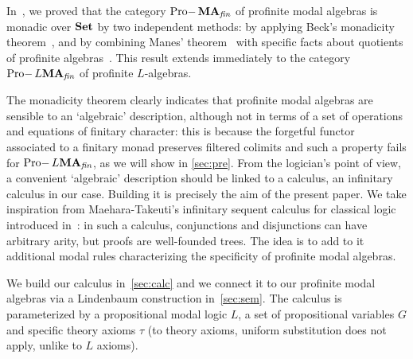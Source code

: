 \documentclass{article}
\theoremstyle{definition}
\DeclareMathOperator{\Pro}{Pro-}
\newcommand{\MA}{\textup{\textbf{MA}}}
\newcommand{\fin}{\textit{fin}}
\newcommand{\Set}{\textup{\textbf{Set}}}
\begin{document}
In~\cite{MDB-SG}, we proved that the category $\Pro \MA_\fin$ of profinite modal algebras is monadic over $\Set$ by two independent methods: by applying Beck’s monadicity theorem~\cite{CWM}, and by combining Manes’ theorem~\cite{manes} with specific facts about quotients of profinite algebras~\cite{gehrke}. This result extends immediately to the category $\Pro L\MA_\fin$ of profinite $L$-algebras.%

The monadicity theorem clearly indicates that profinite modal algebras are sensible to an `algebraic' description, although not in terms of a set of operations and equations of finitary character: this is because the forgetful functor associated to a finitary monad preserves filtered colimits and such a property fails for $\Pro L\MA_\fin$,
as we will show in \cref{sec:pre}. From the logician's point of view, a convenient `algebraic' description should be linked to a calculus, an infinitary calculus in our case.
Building it is precisely  the aim of the present paper. We take inspiration from Maehara-Takeuti's infinitary sequent calculus for classical logic introduced in~\cite[Chapter 4]{Tak}: in such a calculus,  conjunctions and disjunctions can have arbitrary arity, but proofs are well-founded trees. The idea is to add to it additional modal rules characterizing the specificity of profinite modal algebras.

We build our calculus in~\cref{sec:calc} and we connect it to our profinite modal algebras via a Lindenbaum construction in~\cref{sec:sem}. The calculus is parameterized by a propositional modal logic $L$, a set of propositional variables $G$ and specific theory axioms $\tau$ (to theory axioms, uniform substitution does not apply, unlike to $L$ axioms).
\end{document}

